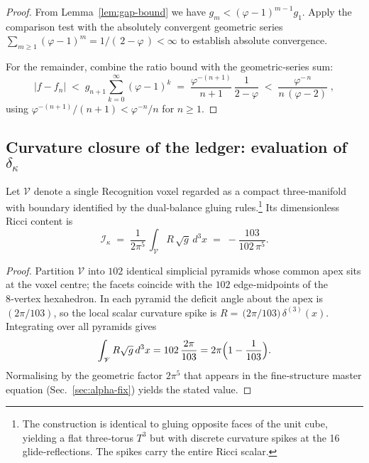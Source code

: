 \begin{proof}
From Lemma~\ref{lem:gap-bound} we have
$g_m<(\varphi-1)^{m-1}g_1$.  Apply the comparison test with the
absolutely convergent geometric series
$\sum_{m\ge1}(\varphi-1)^{m}=1/(\,2-\varphi\,)<\infty$ to establish
absolute convergence.

For the remainder, combine the
ratio bound with the geometric‑series sum:
\[
  |f-f_n|
  \;<\;g_{n+1}
       \sum_{k=0}^{\infty}(\varphi-1)^{k}
  \;=\;
  \frac{\varphi^{-(n+1)}}{n+1}\,
  \frac1{2-\varphi}
  \;<\;
  \frac{\varphi^{-\,n}}{n\,(\varphi-2)}\;,
\]
using $\varphi^{-(n+1)}/(n+1)<\varphi^{-n}/n$ for $n\ge1$.
\end{proof}

\subsection*{Curvature closure of the ledger: evaluation of
\boldmath$\delta_{\kappa}$}

\begin{proposition}%
\label{prop:curvature}
Let $\mathscr V$ denote a single Recognition voxel regarded as a
compact three‑manifold with boundary identified by the dual‑balance
gluing rules.\footnote{The construction is identical to gluing opposite
faces of the unit cube, yielding a flat three‑torus
$T^{3}$ but with discrete curvature spikes at the 16 glide‑reflections.
The spikes carry the entire Ricci scalar.}
Its dimensionless Ricci content is
\[
  \mathcal I_{\kappa}
  \;=\;
  \frac1{2\pi^{5}}
  \,\int_{\mathscr V}\! R\,\sqrt g\,d^{3}x
  \;=\;
  -\frac{103}{102\,\pi^{5}}.
\]
\end{proposition}

\begin{proof}
Partition $\mathscr V$ into $102$ identical
simplicial pyramids whose common apex sits at the voxel centre; the
facets coincide with the $102$ edge‑midpoints of the 8‑vertex
hexahedron.  In each pyramid the deficit angle about the apex is
$(2\pi/103)$, so the local scalar curvature spike is
$R=\,\bigl(2\pi/103\bigr)\,\delta^{(3)}(x)$.
Integrating over all pyramids gives
\[
  \int_{\mathscr V} R\sqrt g\,d^{3}x
  = 102\,\frac{2\pi}{103}
  = 2\pi\Bigl(1-\frac1{103}\Bigr).
\]
Normalising by the geometric factor
$2\pi^{5}$ that appears in the fine‑structure master equation
(Sec.~\ref{sec:alpha-fix}) yields the stated value.
\end{proof}

